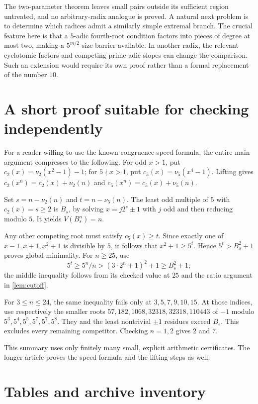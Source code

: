 \documentclass[11pt,a4paper]{article}
\theoremstyle{definition}
\begin{document}
The two-parameter theorem leaves small pairs outside its sufficient
region untreated, and no arbitrary-radix analogue is proved. A natural
next problem is to determine which radices admit a similarly simple
extremal branch. The crucial feature here is that a $5$-adic fourth-root
condition factors into pieces of degree at most two, making a
$5^{m/2}$ size barrier available. In another radix, the relevant
cyclotomic factors and competing prime-adic slopes can change the
comparison. Such an extension would require its own proof rather than
a formal replacement of the number $10$.

\appendix
\section{A short proof suitable for checking independently}
\label{app:short}

For a reader willing to use the known congruence-speed formula, the
entire main argument compresses to the following.
For odd $x>1$, put $c_2(x)=\nu_2(x^2-1)-1$; for $5\nmid x>1$, put
$c_5(x)=\nu_5(x^4-1)$. Lifting gives
$c_2(x^n)=c_2(x)+\nu_2(n)$ and
$c_5(x^n)=c_5(x)+\nu_5(n)$.

Set $s=n-\nu_2(n)$ and $t=n-\nu_5(n)$. The least odd multiple of $5$
with $c_2(x)=s\ge2$ is $B_s$, by solving
$x=j2^s\pm1$ with $j$ odd and then reducing modulo $5$.
It yields $V(B_s^n)=n$.

Any other competing root must satisfy $c_5(x)\ge t$. Since exactly one
of $x-1,x+1,x^2+1$ is divisible by $5$, it follows that
$x^2+1\ge5^t$. Hence $5^t>B_s^2+1$ proves global minimality.
For $n\ge25$, use
\[
5^t\ge5^n/n>(3\cdot2^n+1)^2+1\ge B_s^2+1;
\]
the middle inequality follows from its checked value at $25$ and the
ratio argument in \cref{lem:cutoff}.

For $3\le n\le24$, the same inequality fails only at
$3,5,7,9,10,15$. At those indices, use respectively the smaller roots
$57,182,1068,32318,32318,110443$ of $-1$ modulo
$5^3,5^4,5^5,5^7,5^7,5^8$. They and the least nontrivial $\pm1$
residues exceed $B_s$. This excludes every remaining competitor.
Checking $n=1,2$ gives $2$ and $7$.

This summary uses only finitely many small, explicit arithmetic
certificates. The longer article proves the speed formula and the
lifting steps as well.

\section{Tables and archive inventory}
\label{app:data}
\end{document}
